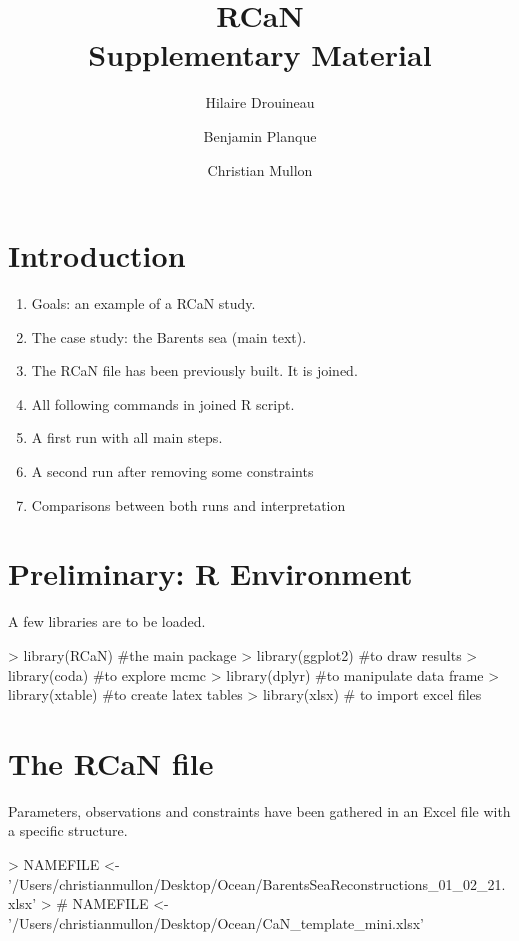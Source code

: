 \documentclass{article}
\title{ \bf{RCaN \\ \vspace{1cm} Supplementary Material \vspace{1cm}} }
\author[1]{Hilaire Drouineau}
\affil[1]{INRAE, Bordeaux, France}
\author[2]{Benjamin Planque}
\affil[2]{HI, Tromsoe, Norway}
\author[3]{Christian Mullon}
\affil[3]{IRD, MARBEC, Sete, France}
\begin{document}



\maketitle

\section{Introduction}
\begin{enumerate}
\item Goals: an example of a RCaN study.
\item The case study: the Barents sea (main text).
\item The RCaN file has been previously built. It is joined.
\item All following commands in joined R script.
\item A first run with all main steps.
\item A second run after removing some constraints
\item Comparisons between both runs and interpretation
\end{enumerate}
\section{Preliminary: R Environment}
A few libraries are to be loaded.

\begin{Schunk}
\begin{Sinput}
> library(RCaN) #the main package
> library(ggplot2) #to draw results
> library(coda) #to explore mcmc 
> library(dplyr) #to manipulate data frame
> library(xtable) #to create latex tables
> library(xlsx) # to import excel files
\end{Sinput}
\end{Schunk}

\clearpage

\section{The RCaN file}
Parameters, observations and constraints have been gathered in an Excel file with a specific structure. 

\begin{Schunk}
\begin{Sinput}
> NAMEFILE <- '/Users/christianmullon/Desktop/Ocean/BarentsSeaReconstructions_01_02_21.xlsx'
> # NAMEFILE <- '/Users/christianmullon/Desktop/Ocean/CaN_template_mini.xlsx'
\end{Sinput}
\end{Schunk}
\end{document}
